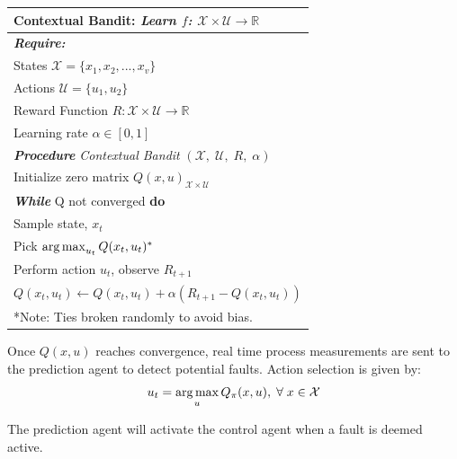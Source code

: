 \begin{table}[htb]
    \begin{center}
	\def\arraystretch{1.1}
	\begin{tabular}{p{9cm}}
	\hline
	\textbf{Contextual Bandit:} \emph{Learn $f$: $\mathcal{X} \times \mathcal{U} \rightarrow \mathbb{R}$} \\ \hline
	    \textbf{\textit{Require:}} \\
	    States ${\mathcal{X}} = \{x_1, x_2, ..., x_v\}$ \\
	    Actions ${\mathcal{U}} = \{u_1, u_2\}$ \\
	    Reward Function $R: {\mathcal{X}} \times {\mathcal{U}} \rightarrow {\mathbb{R}}$ \\
	    Learning rate $\alpha \in [0, 1]$ \\
		\textbf{\textit{Procedure}} \textit{Contextual Bandit} $({\mathcal{X},\; \mathcal{U}},\; R, \; \alpha)$ \\
		\hspace{0.25cm} Initialize zero matrix $Q(x, u)_{{\mathcal{X}} \times {\mathcal{U}}}$ \\
		\hspace{0.25cm} \textbf{\textit{While}} Q not converged \textbf{do} \\
		\hspace{0.5cm} Sample state, $x_t$ \\
		\hspace{0.5cm} Pick $\operatorname*{arg\,max}_{u_t} Q(x_t,u_t)^*$ \\
		\hspace{0.5cm} Perform action $u_t$, observe $R_{t+1}$ \\
		\hspace{0.5cm} $Q(x_t, u_t) \leftarrow Q(x_t, u_t) + \alpha(R_{t+1} - Q(x_t, u_t))$ \\ \hline
		*Note: Ties broken randomly to avoid bias.
	\end{tabular}
	\end{center}
\end{table}

Once $Q(x, u)$ reaches convergence, real time process measurements are sent to the prediction agent to detect potential faults. Action selection is given by:
\begin{equation}
    \centering
    u_t = \argmax_u Q_{\pi}(x, u), \; \forall \; x \in \mathcal{X}
    \label{eq: opt_policy}
\end{equation}

The prediction agent will activate the control agent when a fault is deemed active.


